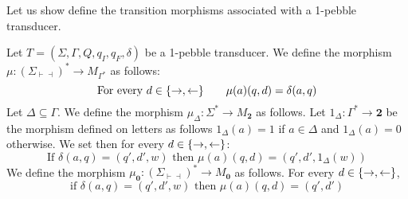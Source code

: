 Let us show define the transition morphisms associated with a 1-pebble transducer.
\begin{definition}
Let $T=(\Sigma, \Gamma, Q, q_I, q_F, \delta)$ be a 1-pebble transducer. 
We define the morphism $\mu:(\Sigma_{\vdash\dashv})^*\to M_{\Gamma^*}$ as follows:
$$\text{For every } d\in \{\rightarrow,\leftarrow\}\qquad\mu(a)(q,d)=\delta(a,q)$$
Let $\Delta\subseteq \Gamma$. We define the morphism $\mu_\Delta:\Sigma^*\to M_{\mathbf 2}$ as follows. Let $1_\Delta:\Gamma^*\to \mathbf{2}$ be the morphism defined on letters as follows $1_\Delta(a)=1$ if $a\in \Delta$ and $1_\Delta(a)=0$ otherwise. We set then for every $d\in\{\rightarrow,\leftarrow\}$: 
$$\text{If } \delta(a,q)=(q',d',w) \text{ then } \mu(a)(q,d)=(q',d',1_\Delta(w))$$
We define the morphism $\mu_{\mathbf{0}}:(\Sigma_{\vdash\dashv})^*\to M_{\mathbf 0}$ as follows. For every $d\in\{\rightarrow,\leftarrow\}$,
$$\text{if } \delta(a,q)=(q',d',w) \text{ then }  \mu(a)(q,d)=(q',d') $$
\end{definition} 

